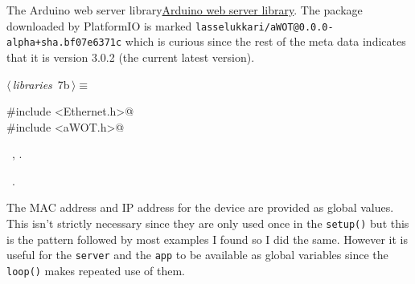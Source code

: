 \documentclass[a4paper, 11pt]{article}
\begin{document}
The Arduino web server library\href{https://github.com/lasselukkari/awot}{Arduino web server library}.
The package downloaded by PlatformIO is marked
\verb|lasselukkari/aWOT@0.0.0-alpha+sha.bf07e6371c|
which is curious since the rest of the meta data indicates that it is version 3.0.2
(the current latest version).

\begin{flushleft} \small
\begin{minipage}{\linewidth}\label{scrap7}\raggedright\small
{}$\langle\,${\itshape libraries}\nobreak\ {\footnotesize{7b}}$\,\rangle\equiv$
\vspace{-1ex}
\begin{list}{}{\setlength{\leftmargin}{1em}} \item
\mbox{}\lstinline@#include <Ethernet.h>@\\
\mbox{}\lstinline@#include <aWOT.h>@\\
\mbox{}{\NWsep}
\end{list}
\vspace{-1ex}
\vspace{-1ex}
\footnotesize
\begin{list}{}{\setlength{\itemsep}{-\parsep}\setlength{\itemindent}{-\leftmargin}}
\item \NWtxtMacroDefBy\ , .
\item \NWtxtMacroRefIn\ .
\end{list}
\end{minipage}
\end{flushleft}

The MAC address and IP address for the device
are provided as global values.
This isn't strictly necessary since they are only used once in the \verb|setup()|
but this is the pattern followed by most examples I found so I did the same.
However it is useful for the \verb|server| and the \verb|app| to be available
as global variables since the \verb|loop()| makes repeated use of them.
\end{document}
